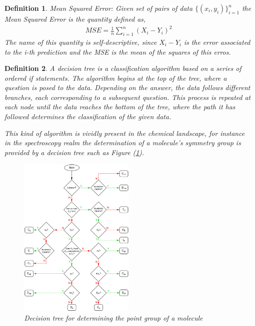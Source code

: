 \documentclass[11pt]{article}
\newtheorem{definition}{Definition}
\begin{document}
\begin{definition}\label{definitionMeanSquaredError}
Mean Squared Error: Given set of pairs of data $\{(x_i,y_i)\}_{i=1}^n$ the Mean Squared Error is the quantity defined as,
\begin{align}
	MSE=\frac{1}{n}\sum_{i=1}^n(X_i-Y_i)^2
\end{align}
The name of this quantity is self-descriptive, since $X_i-Y_i$ is the error associated to the i-th prediction and the MSE is the mean of the squares of this erros.
\end{definition}

\begin{definition}\label{definitionDecisionTree}
A decision tree is a classification algorithm based on a series of ordered \emph{if} statements. The algorithm begins at the top of the tree, where a question is posed to the data. Depending on the answer, the data follows different branches, each corresponding to a subsequent question. This process is repeated at each node until the data reaches the bottom of the tree, where the path it has followed determines the classification of the given data.

This kind of algorithm is vividly present in the chemical landscape, for instance in the spectroscopy realm the determination of a molecule's symmetry group is provided by a decision tree such as Figure (\ref{figExScpectroDecisionTree}).
\begin{figure}[H]
\centering
\includegraphics[width = 0.5\textwidth]{GeneralSources/Point_group_determination_flowchart_v2.png}
\caption{Decision tree for determining the point group of a molecule}
\label{figExScpectroDecisionTree}
\end{figure}
\end{definition}
\end{document}
